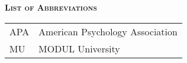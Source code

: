 %
%
% 
% 
% 

\noindent
{\Large\bfseries \textsc{List of Abbreviations}}
\vspace{0.65cm}

\begin{table*}[htbp]
		\begin{tabular}{ll}
			APA & American Psychology Association\\
			MU & MODUL University\\
		\end{tabular}
\end{table*}

	